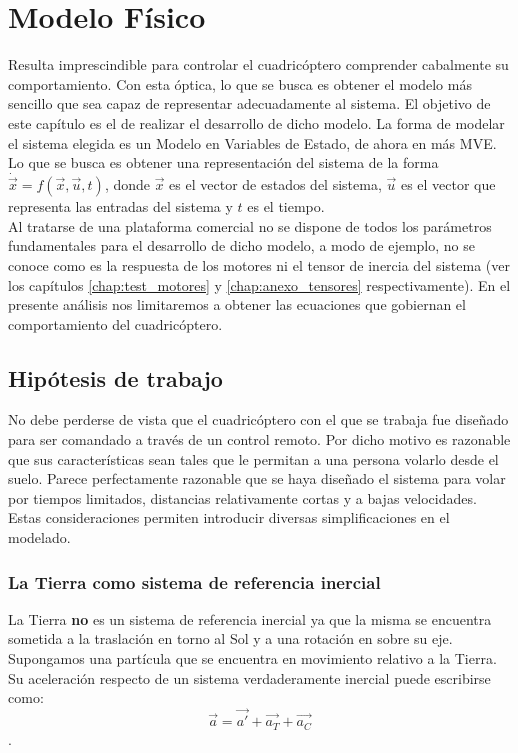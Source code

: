 \documentclass[main]{subfiles}
\begin{document}
\chapter{Modelo F\'isico}
\label{chap:modelo}
Resulta imprescindible para controlar el cuadric\'optero comprender cabalmente su comportamiento. Con esta \'optica, lo que se busca es obtener el modelo m\'as sencillo que sea capaz de representar adecuadamente al sistema. El objetivo de este cap\'itulo es el de realizar el desarrollo de dicho modelo. La forma de modelar el sistema elegida es un Modelo en Variables de Estado, de ahora en m\'as MVE. Lo que se busca es obtener una representaci\'on del sistema de la forma $\dot{\vec{x}}=f\left(\vec{x},\vec{u},t\right)$, donde $\vec{x}$ es el vector de estados del sistema, $\vec{u}$ es el vector que representa las entradas del sistema y $t$ es el tiempo. \\

Al tratarse de una plataforma comercial no se dispone de todos los par\'ametros fundamentales para el desarrollo de dicho modelo, a modo de ejemplo, no se conoce como es la respuesta de los motores  ni el tensor de inercia del sistema (ver los cap\'itulos \ref{chap:test_motores} y \ref{chap:anexo_tensores} respectivamente). En el presente an\'alisis nos limitaremos a obtener las ecuaciones que gobiernan el comportamiento del cuadric\'optero.\\
    


\section{Hip\'otesis de trabajo}

No debe perderse de vista que el cuadric\'optero con el que se trabaja fue dise\~nado para ser comandado a trav\'es de un control remoto. Por dicho motivo es razonable que sus caracter\'isticas sean tales que le permitan a una persona volarlo desde el suelo. Parece perfectamente razonable que se haya dise\~nado el sistema para volar por tiempos limitados, distancias relativamente cortas y a bajas velocidades. Estas consideraciones permiten introducir diversas simplificaciones en el modelado.


\subsection{La Tierra como sistema de referencia inercial}
La Tierra {\bf no} es un sistema de referencia inercial ya que la misma se encuentra sometida a la traslaci\'on en torno al Sol y a una rotaci\'on en sobre su eje. Supongamos una part\'icula que se encuentra en movimiento relativo a la Tierra. Su aceleraci\'on respecto de un sistema verdaderamente inercial puede escribirse como:
\begin{equation}
\vec{a}=\vec{a\prime}+\vec{a_T} +\vec{a_C}
\end{equation}.
\end{document}

